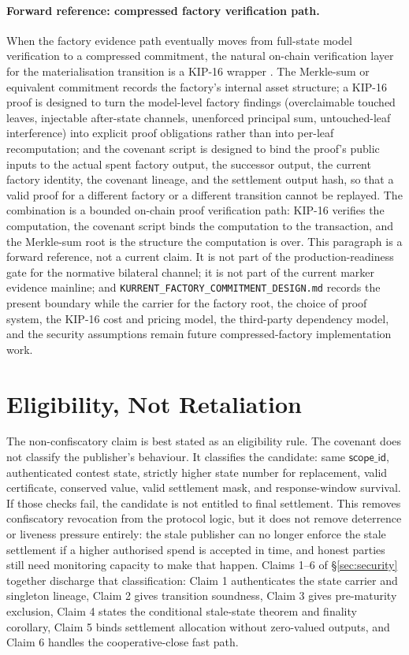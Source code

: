 \documentclass[10pt,a4paper]{article}
\begin{document}
\paragraph{Forward reference: compressed factory verification path.} When the factory evidence path eventually moves from full-state model verification to a compressed commitment, the natural on-chain verification layer for the materialisation transition is a KIP-16 wrapper \cite{kip16}. The Merkle-sum or equivalent commitment records the factory's internal asset structure; a KIP-16 proof is designed to turn the model-level factory findings (overclaimable touched leaves, injectable after-state channels, unenforced principal sum, untouched-leaf interference) into explicit proof obligations rather than into per-leaf recomputation; and the covenant script is designed to bind the proof's public inputs to the actual spent factory output, the successor output, the current factory identity, the covenant lineage, and the settlement output hash, so that a valid proof for a different factory or a different transition cannot be replayed. The combination is a bounded on-chain proof verification path: KIP-16 verifies the computation, the covenant script binds the computation to the transaction, and the Merkle-sum root is the structure the computation is over. This paragraph is a forward reference, not a current claim. It is not part of the production-readiness gate for the normative bilateral channel; it is not part of the current marker evidence mainline; and \texttt{KURRENT\_FACTORY\_COMMITMENT\_DESIGN.md} records the present boundary while the carrier for the factory root, the choice of proof system, the KIP-16 cost and pricing model, the third-party dependency model, and the security assumptions remain future compressed-factory implementation work.

\section{Eligibility, Not Retaliation}

The non-confiscatory claim is best stated as an eligibility rule. The covenant does not classify the publisher's behaviour. It classifies the candidate: same $\mathsf{scope\_id}$, authenticated contest state, strictly higher state number for replacement, valid certificate, conserved value, valid settlement mask, and response-window survival. If those checks fail, the candidate is not entitled to final settlement. This removes confiscatory revocation from the protocol logic, but it does not remove deterrence or liveness pressure entirely: the stale publisher can no longer enforce the stale settlement if a higher authorised spend is accepted in time, and honest parties still need monitoring capacity to make that happen. Claims 1--6 of §\ref{sec:security} together discharge that classification: Claim 1 authenticates the state carrier and singleton lineage, Claim 2 gives transition soundness, Claim 3 gives pre-maturity exclusion, Claim 4 states the conditional stale-state theorem and finality corollary, Claim 5 binds settlement allocation without zero-valued outputs, and Claim 6 handles the cooperative-close fast path.
\end{document}
